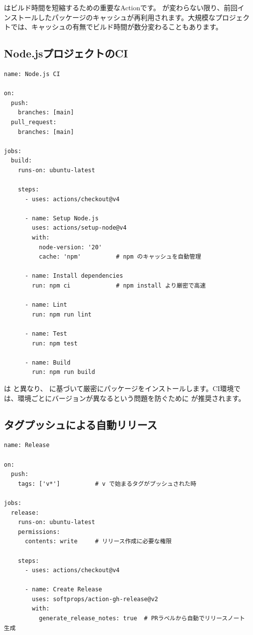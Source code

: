  はビルド時間を短縮するための重要なActionです。 が変わらない限り、前回インストールしたパッケージのキャッシュが再利用されます。大規模なプロジェクトでは、キャッシュの有無でビルド時間が数分変わることもあります。

\subsection{Node.jsプロジェクトのCI}

\begin{lstlisting}[language={}]
name: Node.js CI

on:
  push:
    branches: [main]
  pull_request:
    branches: [main]

jobs:
  build:
    runs-on: ubuntu-latest

    steps:
      - uses: actions/checkout@v4

      - name: Setup Node.js
        uses: actions/setup-node@v4
        with:
          node-version: '20'
          cache: 'npm'          # npm のキャッシュを自動管理

      - name: Install dependencies
        run: npm ci             # npm install より厳密で高速

      - name: Lint
        run: npm run lint

      - name: Test
        run: npm test

      - name: Build
        run: npm run build
\end{lstlisting}

 は  と異なり、 に基づいて厳密にパッケージをインストールします。CI環境では、環境ごとにバージョンが異なるという問題を防ぐために  が推奨されます。

\subsection{タグプッシュによる自動リリース}

\begin{lstlisting}[language={}]
name: Release

on:
  push:
    tags: ['v*']          # v で始まるタグがプッシュされた時

jobs:
  release:
    runs-on: ubuntu-latest
    permissions:
      contents: write     # リリース作成に必要な権限

    steps:
      - uses: actions/checkout@v4

      - name: Create Release
        uses: softprops/action-gh-release@v2
        with:
          generate_release_notes: true  # PRラベルから自動でリリースノート生成
\end{lstlisting}

